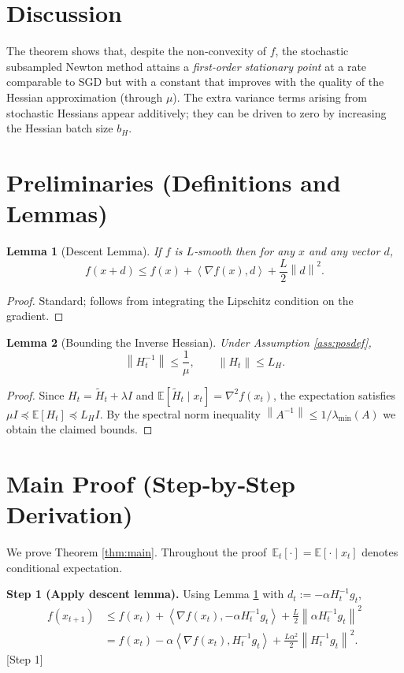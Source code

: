 \documentclass{article}
\newtheorem{lemma}{Lemma}
\newcommand{\E}{\mathbb{E}}
\newcommand{\norm}[1]{\left\lVert #1\right\rVert}
\newcommand{\ip}[2]{\left\langle #1,#2\right\rangle}
\begin{document}
\section*{Discussion}
The theorem shows that, despite the non‑convexity of $f$, the stochastic subsampled Newton method attains a \emph{first‑order stationary point} at a rate comparable to SGD but with a constant that improves with the quality of the Hessian approximation (through $\mu$). The extra variance terms arising from stochastic Hessians appear additively; they can be driven to zero by increasing the Hessian batch size $b_H$.

\newpage
\section*{Preliminaries (Definitions and Lemmas)}
\begin{lemma}[Descent Lemma]\label{lem:descent}
If $f$ is $L$‑smooth then for any $x$ and any vector $d$,
\[
    f(x+d)\le f(x)+\ip{\nabla f(x)}{d}+\frac{L}{2}\norm{d}^{2}.
\]
\end{lemma}
\begin{proof}
Standard; follows from integrating the Lipschitz condition on the gradient. \qedhere
\end{proof}

\begin{lemma}[Bounding the Inverse Hessian]\label{lem:invbound}
Under Assumption \ref{ass:posdef},
\[
    \norm{H_t^{-1}}\le\frac{1}{\mu},\qquad
    \norm{H_t}\le L_H .
\]
\end{lemma}
\begin{proof}
Since $H_t=\tilde H_t+\lambda I$ and $\E[\tilde H_t\mid x_t]=\nabla^{2}f(x_t)$, the expectation satisfies $\mu I\preceq \E[H_t]\preceq L_H I$. By the spectral norm inequality $\norm{A^{-1}}\le 1/\lambda_{\min}(A)$ we obtain the claimed bounds. \qedhere
\end{proof}

\section*{Main Proof (Step‑by‑Step Derivation)}
We prove Theorem \ref{thm:main}. Throughout the proof $\,\E_t[\cdot]=\E[\cdot\mid x_t]$ denotes conditional expectation.

\noindent\textbf{Step 1 (Apply descent lemma).}  
Using Lemma \ref{lem:descent} with $d_t:=-\alpha H_t^{-1}g_t$,
\begin{align}
    f(x_{t+1}) 
    &\le f(x_t)+\ip{\nabla f(x_t)}{-\alpha H_t^{-1}g_t}
        +\frac{L}{2}\norm{\alpha H_t^{-1}g_t}^{2}  \nonumber\\
    & = f(x_t)-\alpha\ip{\nabla f(x_t)}{H_t^{-1}g_t}
        +\frac{L\alpha^{2}}{2}\norm{H_t^{-1}g_t}^{2}.
    \tag{3}\label{eq:descent}
\end{align}
[Step 1]
\end{document}
